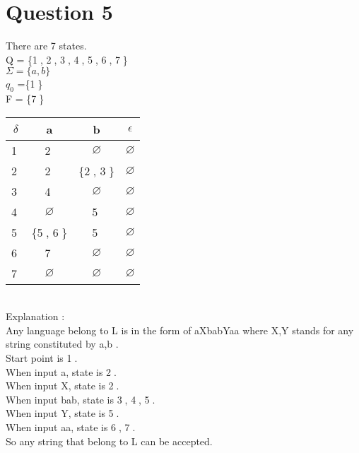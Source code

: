 \documentclass[a4paper]{article}
\begin{document}

\section{Question 5}
There are 7 states.\\
Q = \{\textcircled{1}, \textcircled{2}, \textcircled{3}, \textcircled{4}, \textcircled{5}, \textcircled{6}, \textcircled{7}\}\\
$\Sigma = \{a, b\}$\\
$q_{0}$ =\{\textcircled{1}\}\\
F = \{\textcircled{7}\}\\
\begin{tabular}{|c|c|c|c|}
\hline
$\delta$ & a & b & $\epsilon$  \\ 
\hline
\textcircled{1} & \textcircled{2} & $\varnothing$ & $\varnothing$ \\
\hline
\textcircled{2} & \textcircled{2} & \{\textcircled{2}, \textcircled{3}\} & $\varnothing$ \\
\hline
\textcircled{3} & \textcircled{4} & $\varnothing$ & $\varnothing$ \\
\hline
\textcircled{4} & $\varnothing$ & \textcircled{5} & $\varnothing$ \\
\hline
\textcircled{5} & \{\textcircled{5}, \textcircled{6}\} & \textcircled{5} & $\varnothing$ \\
\hline
\textcircled{6} & \textcircled{7} & $\varnothing$ & $\varnothing$ \\
\hline
\textcircled{7} & $\varnothing$ & $\varnothing$ & $\varnothing$ \\
\hline
\end{tabular}\\
Explanation :\\
Any language belong to L is in the form of aXbabYaa where X,Y stands for any string constituted by {a,b} .\\
Start point is \textcircled{1}.\\
When input a, state is \textcircled{2}.\\
When input X, state is \textcircled{2}.\\
When input bab, state is \textcircled{3}, \textcircled{4}, \textcircled{5}.\\
When input Y, state is \textcircled{5}.\\
When input aa, state is \textcircled{6}, \textcircled{7}.\\
So any string that belong to L can be accepted.
\end{document}
